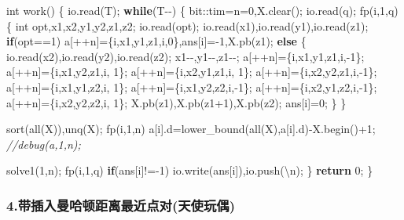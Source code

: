 \documentclass[
]{article}
\newenvironment{Shaded}{}{}
\newcommand{\CharTok}[1]{\textcolor[rgb]{0.25,0.44,0.63}{#1}}
\newcommand{\CommentTok}[1]{\textcolor[rgb]{0.38,0.63,0.69}{\textit{#1}}}
\newcommand{\ControlFlowTok}[1]{\textcolor[rgb]{0.00,0.44,0.13}{\textbf{#1}}}
\newcommand{\DataTypeTok}[1]{\textcolor[rgb]{0.56,0.13,0.00}{#1}}
\newcommand{\DecValTok}[1]{\textcolor[rgb]{0.25,0.63,0.44}{#1}}
\newcommand{\NormalTok}[1]{#1}
\newcommand{\SpecialCharTok}[1]{\textcolor[rgb]{0.25,0.44,0.63}{#1}}
\begin{document}
\begin{Shaded}
\begin{Highlighting}[]
\DataTypeTok{int}\NormalTok{ work()}
\NormalTok{\{}
\NormalTok{    io.read(T);}
    \ControlFlowTok{while}\NormalTok{(T{-}{-})}
\NormalTok{    \{}
\NormalTok{        bit::tim=n=}\DecValTok{0}\NormalTok{,X.clear();}
\NormalTok{        io.read(q);}
\NormalTok{        fp(i,}\DecValTok{1}\NormalTok{,q)}
\NormalTok{        \{}
            \DataTypeTok{int}\NormalTok{ opt,x1,x2,y1,y2,z1,z2;}
\NormalTok{            io.read(opt);}
\NormalTok{            io.read(x1),io.read(y1),io.read(z1);}
            \ControlFlowTok{if}\NormalTok{(opt==}\DecValTok{1}\NormalTok{) a[++n]=\{i,x1,y1,z1,i,}\DecValTok{0}\NormalTok{\},ans[i]={-}}\DecValTok{1}\NormalTok{,X.pb(z1);}
            \ControlFlowTok{else}
\NormalTok{            \{}
\NormalTok{                io.read(x2),io.read(y2),io.read(z2);}
\NormalTok{                x1{-}{-},y1{-}{-},z1{-}{-};}
\NormalTok{                a[++n]=\{i,x1,y1,z1,i,{-}}\DecValTok{1}\NormalTok{\};}
\NormalTok{                a[++n]=\{i,x1,y2,z1,i, }\DecValTok{1}\NormalTok{\};}
\NormalTok{                a[++n]=\{i,x2,y1,z1,i, }\DecValTok{1}\NormalTok{\};}
\NormalTok{                a[++n]=\{i,x2,y2,z1,i,{-}}\DecValTok{1}\NormalTok{\};}
\NormalTok{                a[++n]=\{i,x1,y1,z2,i, }\DecValTok{1}\NormalTok{\};}
\NormalTok{                a[++n]=\{i,x1,y2,z2,i,{-}}\DecValTok{1}\NormalTok{\};}
\NormalTok{                a[++n]=\{i,x2,y1,z2,i,{-}}\DecValTok{1}\NormalTok{\};}
\NormalTok{                a[++n]=\{i,x2,y2,z2,i, }\DecValTok{1}\NormalTok{\};}
\NormalTok{                X.pb(z1),X.pb(z1+}\DecValTok{1}\NormalTok{),X.pb(z2);}
\NormalTok{                ans[i]=}\DecValTok{0}\NormalTok{;}
\NormalTok{            \}}
\NormalTok{        \}}

\NormalTok{        sort(all(X)),unq(X);}
\NormalTok{        fp(i,}\DecValTok{1}\NormalTok{,n) a[i].d=lower\_bound(all(X),a[i].d){-}X.begin()+}\DecValTok{1}\NormalTok{;}
        \CommentTok{//debug(a,1,n);}

\NormalTok{        solve1(}\DecValTok{1}\NormalTok{,n);}
\NormalTok{        fp(i,}\DecValTok{1}\NormalTok{,q) }\ControlFlowTok{if}\NormalTok{(ans[i]!={-}}\DecValTok{1}\NormalTok{) io.write(ans[i]),io.push(}\CharTok{\textquotesingle{}}\SpecialCharTok{\textbackslash{}n}\CharTok{\textquotesingle{}}\NormalTok{);}
\NormalTok{    \}}
    \ControlFlowTok{return} \DecValTok{0}\NormalTok{;}
\NormalTok{\}}
\end{Highlighting}
\end{Shaded}

\hypertarget{ux5e26ux63d2ux5165ux66fcux54c8ux987fux8dddux79bbux6700ux8fd1ux70b9ux5bf9ux5929ux4f7fux73a9ux5076}{%
\subsubsection{4.带插入曼哈顿距离最近点对(天使玩偶)}\label{ux5e26ux63d2ux5165ux66fcux54c8ux987fux8dddux79bbux6700ux8fd1ux70b9ux5bf9ux5929ux4f7fux73a9ux5076}}
\end{document}
